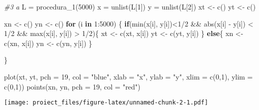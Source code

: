 \documentclass[
]{article}
\newenvironment{Shaded}{\begin{snugshade}}{\end{snugshade}}
\newcommand{\AttributeTok}[1]{\textcolor[rgb]{0.77,0.63,0.00}{#1}}
\newcommand{\CommentTok}[1]{\textcolor[rgb]{0.56,0.35,0.01}{\textit{#1}}}
\newcommand{\ControlFlowTok}[1]{\textcolor[rgb]{0.13,0.29,0.53}{\textbf{#1}}}
\newcommand{\DecValTok}[1]{\textcolor[rgb]{0.00,0.00,0.81}{#1}}
\newcommand{\FunctionTok}[1]{\textcolor[rgb]{0.00,0.00,0.00}{#1}}
\newcommand{\NormalTok}[1]{#1}
\newcommand{\OtherTok}[1]{\textcolor[rgb]{0.56,0.35,0.01}{#1}}
\newcommand{\SpecialCharTok}[1]{\textcolor[rgb]{0.00,0.00,0.00}{#1}}
\newcommand{\StringTok}[1]{\textcolor[rgb]{0.31,0.60,0.02}{#1}}
\begin{document}
\begin{Shaded}
\begin{Highlighting}[]
\CommentTok{\#3 a}
\NormalTok{L }\OtherTok{=} \FunctionTok{procedura\_1}\NormalTok{(}\DecValTok{5000}\NormalTok{)}
\NormalTok{x }\OtherTok{=} \FunctionTok{unlist}\NormalTok{(L[}\DecValTok{1}\NormalTok{])}
\NormalTok{y }\OtherTok{=} \FunctionTok{unlist}\NormalTok{(L[}\DecValTok{2}\NormalTok{])}
\NormalTok{xt }\OtherTok{\textless{}{-}} \FunctionTok{c}\NormalTok{()}
\NormalTok{yt }\OtherTok{\textless{}{-}} \FunctionTok{c}\NormalTok{()}

\NormalTok{xn }\OtherTok{\textless{}{-}} \FunctionTok{c}\NormalTok{()}
\NormalTok{yn }\OtherTok{\textless{}{-}} \FunctionTok{c}\NormalTok{()}
\ControlFlowTok{for}\NormalTok{ (i }\ControlFlowTok{in} \DecValTok{1}\SpecialCharTok{:}\DecValTok{5000}\NormalTok{)}
\NormalTok{\{}
  \ControlFlowTok{if}\NormalTok{(}\FunctionTok{min}\NormalTok{(x[i], y[i])}\SpecialCharTok{\textless{}}\DecValTok{1}\SpecialCharTok{/}\DecValTok{2} \SpecialCharTok{\&\&} \FunctionTok{abs}\NormalTok{(x[i] }\SpecialCharTok{{-}}\NormalTok{ y[i]) }\SpecialCharTok{\textless{}} \DecValTok{1}\SpecialCharTok{/}\DecValTok{2} \SpecialCharTok{\&\&} \FunctionTok{max}\NormalTok{(x[i], y[i]) }\SpecialCharTok{\textgreater{}} \DecValTok{1}\SpecialCharTok{/}\DecValTok{2}\NormalTok{)\{}
\NormalTok{    xt }\OtherTok{\textless{}{-}} \FunctionTok{c}\NormalTok{(xt, x[i])}
\NormalTok{    yt }\OtherTok{\textless{}{-}} \FunctionTok{c}\NormalTok{(yt, y[i])}
\NormalTok{  \}}
  \ControlFlowTok{else}\NormalTok{\{}
\NormalTok{    xn }\OtherTok{\textless{}{-}} \FunctionTok{c}\NormalTok{(xn, x[i])}
\NormalTok{    yn }\OtherTok{\textless{}{-}} \FunctionTok{c}\NormalTok{(yn, y[i])}
\NormalTok{  \}}
    
\NormalTok{\}}

\FunctionTok{plot}\NormalTok{(xt, yt, }\AttributeTok{pch =} \DecValTok{19}\NormalTok{, }\AttributeTok{col =} \StringTok{"blue"}\NormalTok{, }\AttributeTok{xlab =} \StringTok{"x"}\NormalTok{, }\AttributeTok{ylab =} \StringTok{"y"}\NormalTok{, }\AttributeTok{xlim =} \FunctionTok{c}\NormalTok{(}\DecValTok{0}\NormalTok{,}\DecValTok{1}\NormalTok{), }\AttributeTok{ylim =} \FunctionTok{c}\NormalTok{(}\DecValTok{0}\NormalTok{,}\DecValTok{1}\NormalTok{))}
\FunctionTok{points}\NormalTok{(xn, yn, }\AttributeTok{pch =} \DecValTok{19}\NormalTok{, }\AttributeTok{col =} \StringTok{"red"}\NormalTok{)}
\end{Highlighting}
\end{Shaded}

\texttt{[image: proiect\_files/figure-latex/unnamed-chunk-2-1.pdf]}
\end{document}
